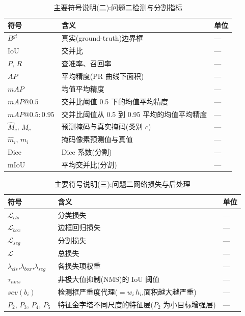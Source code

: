 \begin{table}[H]
\centering
\small
\renewcommand{\arraystretch}{1.0}
\setlength{\tabcolsep}{2.5pt}
\caption{主要符号说明(二):问题二检测与分割指标}
\begin{tabular}{p{3.2cm}p{10.0cm}p{1.3cm}}
\toprule
符号 & 含义 & 单位 \\
\midrule
$B^{gt}$ & 真实(ground-truth)边界框 & — \\
$\mathrm{IoU}$ & 交并比 & — \\
$P$, $R$ & 查准率、召回率 & — \\
$AP$ & 平均精度(PR 曲线下面积) & — \\
$mAP$ & 均值平均精度 & — \\
$mAP@0.5$ & 交并比阈值 0.5 下的均值平均精度 & — \\
$mAP@0.5:0.95$ & 交并比阈值从 0.5 到 0.95 平均的均值平均精度 & — \\
$\hat{M}_c$, $M_c$ & 预测掩码与真实掩码(类别 $c$) & — \\
$\hat{m}_i$, $m_i$ & 掩码像素预测值与真值 & — \\
$\mathrm{Dice}$ & Dice 系数(分割) & — \\
$\mathrm{mIoU}$ & 平均交并比(分割) & — \\
\bottomrule
\end{tabular}
\end{table}

\begin{table}[H]
\centering
\small
\renewcommand{\arraystretch}{1.0}
\setlength{\tabcolsep}{2.5pt}
\caption{主要符号说明(三):问题二网络损失与后处理}
\begin{tabular}{p{3.2cm}p{10.0cm}p{1.3cm}}
\toprule
符号 & 含义 & 单位 \\
\midrule
$\mathcal{L}_{cls}$ & 分类损失 & — \\
$\mathcal{L}_{box}$ & 边框回归损失 & — \\
$\mathcal{L}_{seg}$ & 分割损失 & — \\
$\mathcal{L}$ & 总损失 & — \\
$\lambda_{cls}$,$\lambda_{box}$,$\lambda_{seg}$ & 各损失项权重 & — \\
$\tau_{nms}$ & 非极大值抑制(NMS)的 IoU 阈值 & — \\
$sev(b_i)$ & 检测框严重度代理($=w_i\,h_i$,面积越大越严重) & — \\
$P_2$, $P_3$, $P_4$, $P_5$ & 特征金字塔不同尺度的特征层($P_2$ 为小目标增强层) & — \\
\bottomrule
\end{tabular}
\end{table}

